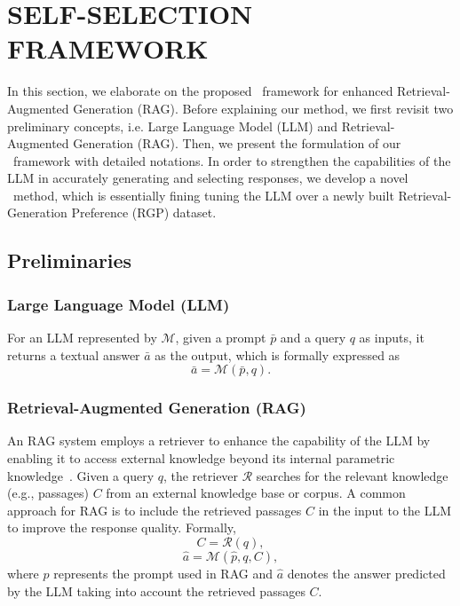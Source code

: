 
\section{SELF-SELECTION FRAMEWORK}
In this section, we elaborate on the proposed \framework~framework for enhanced Retrieval-Augmented Generation (RAG). 
Before explaining our method, we first revisit two preliminary concepts, i.e. Large Language Model (LLM) and Retrieval-Augmented Generation (RAG).  
Then, we present the formulation of our \framework~framework with detailed notations.
In order to strengthen the capabilities of the LLM in accurately generating and selecting responses, we develop a novel \approach~method, which is essentially fining tuning the LLM over a newly built Retrieval-Generation Preference (RGP) dataset. 

\subsection{Preliminaries}
\subsubsection{\textbf{Large Language Model (LLM)}}
For an LLM represented by $\mathcal{M}$, given a prompt $\bar{p}$ and a query $q$ as inputs, it returns a textual answer $\bar{a}$ as the output, which is formally expressed as 
\begin{equation}\label{eq:llm-ans}
\bar{a} = \mathcal{M}(\bar{p}, q).
\end{equation}
\subsubsection{\textbf{Retrieval-Augmented Generation (RAG)}} 
An RAG system employs a retriever to enhance the capability of the LLM by enabling it to access external knowledge beyond its internal parametric knowledge~\cite{lee2019LatentRetrieval, Guu2020REALM}. 
Given a query $q$, the retriever $\mathcal{R}$ searches for the relevant knowledge (e.g., passages) $C$ from an external knowledge base or corpus. 
A common approach for RAG is to include the retrieved passages $C$ in the input to the LLM to improve the response quality.
Formally,
\begin{equation}
C = \mathcal{R}(q)\label{eq:retrieval},
\end{equation}
\begin{equation}\label{eq:rag-ans}
\hat{a} = \mathcal{M}(\hat{p}, q, C),
\end{equation}
where $\hat{p}$ represents the prompt used in RAG and $\hat{a}$ denotes the answer predicted by the LLM taking into account the retrieved passages $C$.


